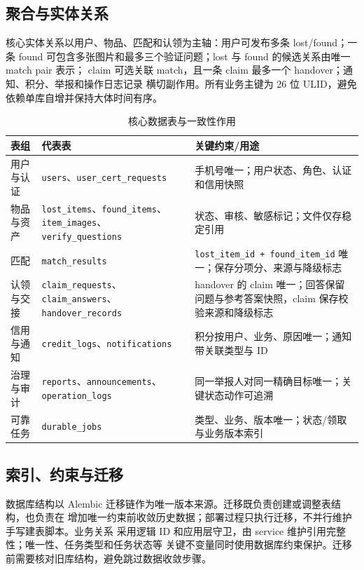 \subsection{聚合与实体关系}

核心实体关系以用户、物品、匹配和认领为主轴：用户可发布多条 lost/found；一条 found
可包含多张图片和最多三个验证问题；lost 与 found 的候选关系由唯一 match pair 表示；
claim 可选关联 match，且一条 claim 最多一个 handover；通知、积分、举报和操作日志记录
横切副作用。所有业务主键为 26 位 ULID，避免依赖单库自增并保持大体时间有序。

\begin{table}[H]
  \centering
  \caption{核心数据表与一致性作用}
  \begin{tabularx}{\textwidth}{L{3.5cm}Y Y}
    \toprule
    表组 & 代表表 & 关键约束/用途 \\
    \midrule
    用户与认证 & \texttt{users}、\texttt{user\_cert\_requests} & 手机号唯一；用户状态、角色、认证和信用快照 \\
    物品与资产 & \texttt{lost\_items}、\texttt{found\_items}、\texttt{item\_images}、\texttt{verify\_questions} & 状态、审核、敏感标记；文件仅存稳定引用 \\
    匹配 & \texttt{match\_results} & \texttt{lost\_item\_id + found\_item\_id} 唯一；保存分项分、来源与降级标志 \\
    认领与交接 & \texttt{claim\_requests}、\texttt{claim\_answers}、\texttt{handover\_records} & handover 的 claim 唯一；回答保留问题与参考答案快照，claim 保存校验来源和降级标志 \\
    信用与通知 & \texttt{credit\_logs}、\texttt{notifications} & 积分按用户、业务、原因唯一；通知带关联类型与 ID \\
    治理与审计 & \texttt{reports}、\texttt{announcements}、\texttt{operation\_logs} & 同一举报人对同一精确目标唯一；关键状态动作可追溯 \\
    可靠任务 & \texttt{durable\_jobs} & 类型、业务、版本唯一；状态/领取与业务版本索引 \\
    \bottomrule
  \end{tabularx}
\end{table}

\subsection{索引、约束与迁移}

数据库结构以 Alembic 迁移链作为唯一版本来源。迁移既负责创建或调整表结构，也负责在
增加唯一约束前收敛历史数据；部署过程只执行迁移，不并行维护手写建表脚本。业务关系
采用逻辑 ID 和应用层守卫，由 service 维护引用完整性；唯一性、任务类型和任务状态等
关键不变量同时使用数据库约束保护。迁移前需要核对旧库结构，避免跳过数据收敛步骤。


